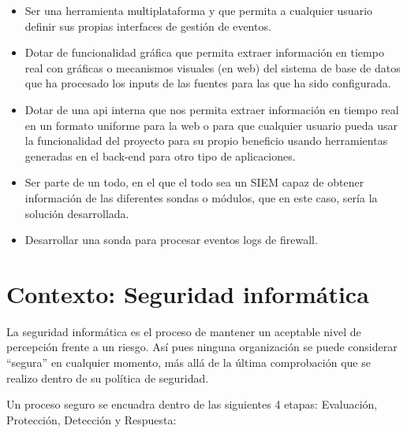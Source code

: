 \begin{itemize}
\item Ser una herramienta multiplataforma y que permita a cualquier usuario definir sus propias interfaces de gestión de eventos.
\item Dotar de funcionalidad gráfica que permita extraer información en tiempo real con gráficas o mecanismos visuales (en web) del sistema de base de datos que ha procesado los inputs de las fuentes para las que ha sido configurada.
\item Dotar de una api interna que nos permita extraer información en tiempo real en un formato uniforme para la web o para que cualquier usuario pueda usar la funcionalidad del proyecto para su propio beneficio usando herramientas generadas en el back-end para otro tipo de aplicaciones.
\item Ser parte de un todo, en el que el todo sea un SIEM capaz de obtener información de las diferentes sondas o módulos, que en este caso, sería la solución desarrollada.
\item Desarrollar una sonda para procesar eventos logs de firewall.
\end{itemize}

\section{Contexto: Seguridad informática}

La seguridad informática es el proceso de mantener un aceptable nivel de percepción frente a un riesgo. Así pues ninguna organización se puede considerar ``segura'' en cualquier momento, más allá de la última comprobación que se realizo dentro de su política de seguridad.

Un proceso seguro se encuadra dentro de las siguientes 4 etapas: Evaluación, Protección, Detección y Respuesta:

